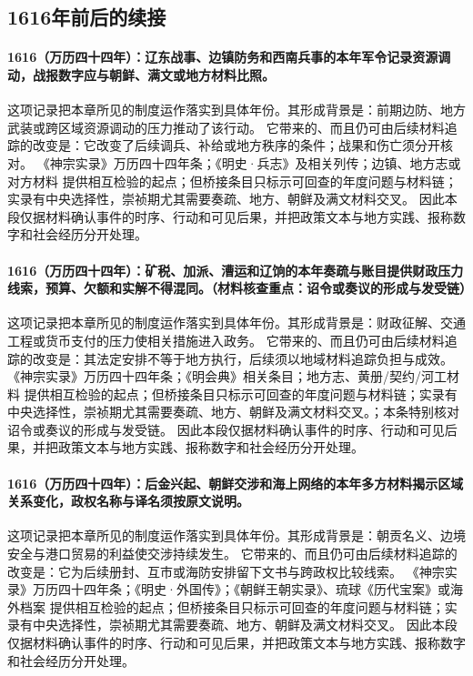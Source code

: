 \subsection{1616年前后的续接}

\paragraph{1616（万历四十四年）：辽东战事、边镇防务和西南兵事的本年军令记录资源调动，战报数字应与朝鲜、满文或地方材料比照。} 这项记录把本章所见的制度运作落实到具体年份。其形成背景是：前期边防、地方武装或跨区域资源调动的压力推动了该行动。 它带来的、而且仍可由后续材料追踪的改变是：它改变了后续调兵、补给或地方秩序的条件；战果和伤亡须分开核对。 《神宗实录》万历四十四年条；《明史·兵志》及相关列传；边镇、地方志或对方材料 提供相互检验的起点；但桥接条目只标示可回查的年度问题与材料链；实录有中央选择性，崇祯期尤其需要奏疏、地方、朝鲜及满文材料交叉。 因此本段仅据材料确认事件的时序、行动和可见后果，并把政策文本与地方实践、报称数字和社会经历分开处理。

\paragraph{1616（万历四十四年）：矿税、加派、漕运和辽饷的本年奏疏与账目提供财政压力线索，预算、欠额和实解不得混同。（材料核查重点：诏令或奏议的形成与发受链）} 这项记录把本章所见的制度运作落实到具体年份。其形成背景是：财政征解、交通工程或货币支付的压力使相关措施进入政务。 它带来的、而且仍可由后续材料追踪的改变是：其法定安排不等于地方执行，后续须以地域材料追踪负担与成效。 《神宗实录》万历四十四年条；《明会典》相关条目；地方志、黄册/契约/河工材料 提供相互检验的起点；但桥接条目只标示可回查的年度问题与材料链；实录有中央选择性，崇祯期尤其需要奏疏、地方、朝鲜及满文材料交叉。；本条特别核对诏令或奏议的形成与发受链。 因此本段仅据材料确认事件的时序、行动和可见后果，并把政策文本与地方实践、报称数字和社会经历分开处理。

\paragraph{1616（万历四十四年）：后金兴起、朝鲜交涉和海上网络的本年多方材料揭示区域关系变化，政权名称与译名须按原文说明。} 这项记录把本章所见的制度运作落实到具体年份。其形成背景是：朝贡名义、边境安全与港口贸易的利益使交涉持续发生。 它带来的、而且仍可由后续材料追踪的改变是：它为后续册封、互市或海防安排留下文书与跨政权比较线索。 《神宗实录》万历四十四年条；《明史·外国传》；《朝鲜王朝实录》、琉球《历代宝案》或海外档案 提供相互检验的起点；但桥接条目只标示可回查的年度问题与材料链；实录有中央选择性，崇祯期尤其需要奏疏、地方、朝鲜及满文材料交叉。 因此本段仅据材料确认事件的时序、行动和可见后果，并把政策文本与地方实践、报称数字和社会经历分开处理。

